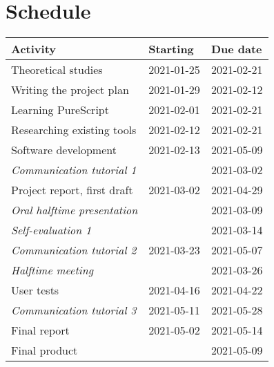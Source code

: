 \section{Schedule}

\begin{center}
    \begin{tabular}{|l|l|l|}
        \hline
        \textbf{Activity}                           & \textbf{Starting} & \textbf{Due date} \\ \hline
        Theoretical studies                         & 2021-01-25        & 2021-02-21        \\ \hline
        Writing the project plan                    & 2021-01-29        & 2021-02-12        \\ \hline
        Learning PureScript                         & 2021-02-01        & 2021-02-21        \\ \hline
        Researching existing tools                  & 2021-02-12        & 2021-02-21        \\ \hline
        Software development                        & 2021-02-13        & 2021-05-09        \\ \hline
        \emph{Communication tutorial 1}             &                   & 2021-03-02        \\ \hline
        Project report, first draft                 & 2021-03-02        & 2021-04-29        \\ \hline
        \emph{Oral halftime presentation}           &                   & 2021-03-09        \\ \hline
        \emph{Self-evaluation 1}                    &                   & 2021-03-14        \\ \hline
        \emph{Communication tutorial 2}             & 2021-03-23        & 2021-05-07        \\ \hline
        \emph{Halftime meeting}                     &                   & 2021-03-26        \\ \hline
        User tests                                  & 2021-04-16        & 2021-04-22        \\ \hline
        \emph{Communication tutorial 3}             & 2021-05-11        & 2021-05-28        \\ \hline
        {Final report}                              & 2021-05-02        & 2021-05-14        \\ \hline
        {Final product}                             &                   & 2021-05-09        \\ \hline

\end{tabular}
\end{center}
